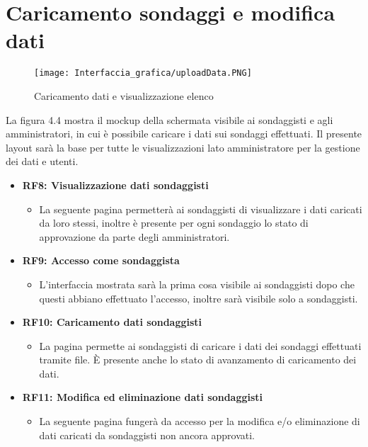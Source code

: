 \section{Caricamento sondaggi e modifica dati}
    \label{fig:4.4}
    \begin{figure}[H]
        \center
        \texttt{[image: Interfaccia\_grafica/uploadData.PNG]}
        \caption{Caricamento dati e visualizzazione elenco}
    \end{figure} 
    La figura 4.4 mostra il mockup della schermata visibile ai sondaggisti e agli amministratori, in cui è possibile caricare i dati sui sondaggi effettuati.\newline
    Il presente layout sarà la base per tutte le visualizzazioni lato amministratore per la gestione dei dati e utenti.
    \begin{itemize}
        \item \textbf{RF8: Visualizzazione dati sondaggisti} \begin{itemize}
            \item La seguente pagina permetterà ai sondaggisti di visualizzare i dati caricati da loro stessi, inoltre è presente per ogni sondaggio lo stato di approvazione da parte degli amministratori.
        \end{itemize}
        \item \textbf{RF9: Accesso come sondaggista} \begin{itemize}
            \item L'interfaccia mostrata sarà la prima cosa visibile ai sondaggisti dopo che questi abbiano effettuato l'accesso, inoltre sarà visibile solo a sondaggisti.
        \end{itemize}
        \item \textbf{RF10: Caricamento dati sondaggisti} \begin{itemize}
            \item La pagina permette ai sondaggisti di caricare i dati dei sondaggi effettuati tramite file. È presente anche lo stato di avanzamento di caricamento dei dati.
        \end{itemize}
        \item \textbf{RF11: Modifica ed eliminazione dati sondaggisti} \begin{itemize}
            \item La seguente pagina fungerà da accesso per la modifica e/o eliminazione di dati caricati da sondaggisti non ancora approvati.
        \end{itemize}

\end{itemize}

